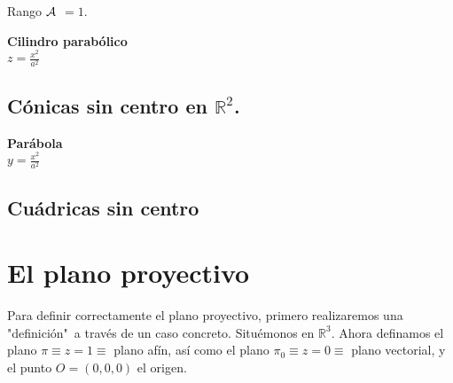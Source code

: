 \documentclass[11pt, a4paper]{article}
\newif\IfInSansMode
\let\oldsf\sffamily
\renewcommand*{\sffamily}{\oldsf\mathversion{sans}\InSansModetrue}
\theoremstyle{theorem-style}
\theoremstyle{definition-style}
\theoremstyle{remark-style}
\theoremstyle{example-style}
\begin{document}
Rango $\cal A$ $=1$.

\begin{minipage}[c]{0.45\textwidth}
  {\bf Cilindro parabólico}\vspace{1em}\\
  $\displaystyle z = \frac{x^2}{a^2}$
\end{minipage}\hfill
\begin{minipage}[]{0.45\textwidth}
\end{minipage}


\subsection{Cónicas sin centro en $\mathbb{R}^2$.}


\begin{minipage}[c]{0.45\textwidth}
  {\bf Parábola}\vspace{1em}\\
  $\displaystyle y = \frac{x^2}{a^2}$
\end{minipage}\hfill
\begin{minipage}[]{0.35\textwidth}
\end{minipage}



\subsection{Cuádricas sin centro}

\newpage

\section{El plano proyectivo}

Para definir correctamente el plano proyectivo, primero realizaremos una "definición"\ a través de un caso concreto. Situémonos en $\mathbb{R}^3$. Ahora definamos el plano $\pi \equiv z = 1 \equiv$ plano afín, así como el plano $\pi_0 \equiv z = 0 \equiv$ plano vectorial, y el punto $O = (0,0,0)$ el origen.
\end{document}
